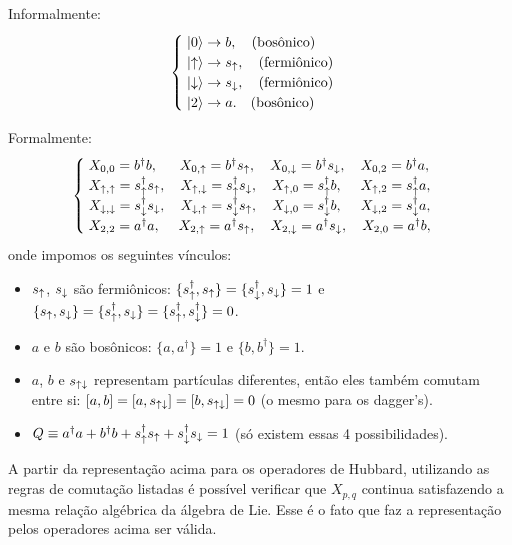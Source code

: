 \documentclass[a4paper,fleqn,12pt]{article}
\renewcommand{\d}{\dagger}
\begin{document}
Informalmente:
$$
\begin{cases}
\; \ket{0} \to b, \quad \text{(bosônico)} \\
\; \ket{\uparrow} \to s_\uparrow, \quad \text{(fermiônico)} \\
\; \ket{\downarrow} \to s_\downarrow, \quad \text{(fermiônico)} \\
\; \ket{2} \to a. \quad \text{(bosônico)}
\end{cases}
$$

Formalmente:
$$
\begin{cases}
\; X_{0,0} = b^\d b, \quad \;\; X_{0, \up} = b^\d s_\up,
 \quad X_{0, \dn} = b^\d s_\dn, \quad X_{0, 2} = b^\d a, \\
\; X_{\up,\up} = s_\up^\d s_\up, \quad X_{\up, \dn} = s_\up^\d s_\dn,
 \quad X_{\up, 0} = s_\up^\d b, \quad \; X_{\up, 2} = s_\up^\d a, \\
\; X_{\dn,\dn} = s_\dn^\d s_\dn, \quad X_{\dn, \up} = s_\dn^\d s_\up,
 \quad X_{\dn, 0} = s_\dn^\d b, \quad \; X_{\dn, 2} = s_\dn^\d a, \\
\; X_{2,2} = a^\d a, \quad \; X_{2, \up} = a^\d s_\up,
 \quad X_{2, \dn} = a^\d s_\dn, \quad X_{2, 0} = a^\d b,
\end{cases}
$$
onde impomos os seguintes vínculos:
\begin{itemize}
\item $s_\uparrow$, $s_\downarrow$ são fermiônicos: $\{s_\up^\d, s_\up\} = \{s_\dn^\d, s_\dn\} = 1$ e $\{s_\up, s_\dn\} = \{s_\up^\d, s_\dn\} = \{s_\up^\d, s_\dn^\d\} = 0$.
\item $a$ e $b$ são bosônicos: $\{a,a^\d\} =1$ e $\{b, b^\d\} = 1$.
\item $a$, $b$ e $s_{\uparrow\downarrow}$ representam partículas diferentes, então eles também comutam entre si: $[a, b] = [a, s_{\uparrow\downarrow}] = [b, s_{\uparrow\downarrow}] = 0$ (o mesmo para os dagger's).
\item $Q \equiv a^\d a + b^\d b + s_\up^\d s_\up + s_\dn^\d s_\dn = 1$ (só existem essas 4 possibilidades).
\end{itemize}

A partir da representação acima para os operadores de Hubbard, utilizando as regras de comutação listadas é possível verificar que $X_{p,q}$ continua satisfazendo a mesma relação algébrica da álgebra de Lie. Esse é o fato que faz a representação pelos operadores acima ser válida.
\end{document}
